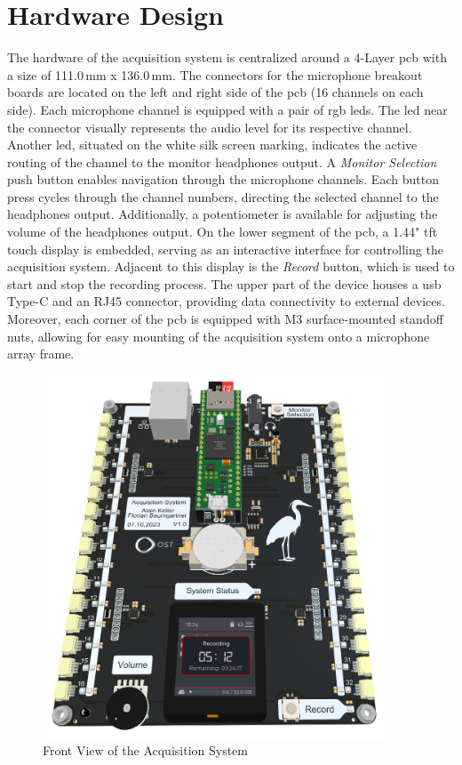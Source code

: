 \section{Hardware Design}
The hardware of the acquisition system is centralized around a 4-Layer \acrshort{pcb} with a size of 111.0\,mm x 136.0\,mm.
The connectors for the microphone breakout boards are located on the left and right side of the \acrshort{pcb} (16 channels on each side).
Each microphone channel is equipped with a pair of \acrshort{rgb} \acrshort{led}s.
The \acrshort{led} near the connector visually represents the audio level for its respective channel.
Another \acrshort{led}, situated on the white silk screen marking, indicates the active routing of the channel to the monitor headphones output.
A \textit{Monitor Selection} push button enables navigation through the microphone channels.
Each button press cycles through the channel numbers, directing the selected channel to the headphones output.
Additionally, a potentiometer is available for adjusting the volume of the headphones output.
On the lower segment of the \acrshort{pcb}, a 1.44" \acrshort{tft} touch display is embedded, serving as an interactive interface for controlling the acquisition system.
Adjacent to this display is the \textit{Record} button, which is used to start and stop the recording process.
The upper part of the device houses a \acrshort{usb} Type-C and an RJ45 connector, providing data connectivity to external devices.
Moreover, each corner of the \acrshort{pcb} is equipped with M3 surface-mounted standoff nuts, allowing for easy mounting of the acquisition system onto a microphone array frame.
\begin{figure}[h]
	\centering
	\includegraphics[width=0.92\textwidth, trim={0 0.5cm 0 0}]{images/4_design_acquisition_system/Acquisition_System_Front.png}
	\caption{Front View of the Acquisition System}
	\label{fig:acquisition_system_front}
\end{figure}
\newpage

